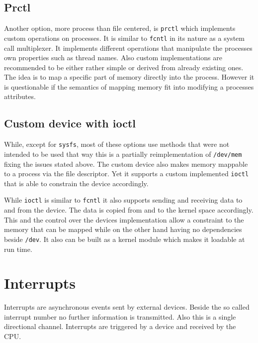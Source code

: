 \documentclass[
a4paper,
12pt,
notitlepage,
parskip=half,
DIV=11,
]{scrbook}
\begin{document}
		\subsection{Prctl}
		
		Another option, more process than file centered, is \texttt{prctl} which implements custom operations on processes.
		It is similar to \texttt{fcntl} in its nature as a system call multiplexer.
		It implements different operations that manipulate the processes own properties such as thread names.
		Also custom implementations are recommended to be either rather simple or derived from already existing ones.
		The idea is to map a specific part of memory directly into the process.
		However it is questionable if the semantics of mapping memory fit into modifying a processes attributes. \citep{syscall} \citep{prctl}
		
		\subsection{Custom device with ioctl}
		\label{hwio}
		
		While, except for \texttt{sysfs}, most of these options use methods that were not intended to be used that way this is a partially reimplementation of \texttt{/dev/mem} fixing the issues stated above.
		The custom device also makes memory mappable to a process via the file descriptor.
		Yet it supports a custom implemented \texttt{ioctl} that is able to constrain the device accordingly.
		
		While \texttt{ioctl} is similar to \texttt{fcntl} it also supports sending and receiving data to and from the device.
		The data is copied from and to the kernel space accordingly.
		This and the control over the devices implementation allow a constraint to the memory that can be mapped while on the other hand having no dependencies beside \texttt{/dev}.
		It also can be built as a kernel module which makes it loadable at run time. \citep{ioctl}
		
		
		\section{Interrupts}
		
		Interrupts are asynchronous events sent by external devices.
		Beside the so called interrupt number no further information is transmitted.
		Also this is a single directional channel.
		Interrupts are triggered by a device and received by the CPU.
		
\end{document}
